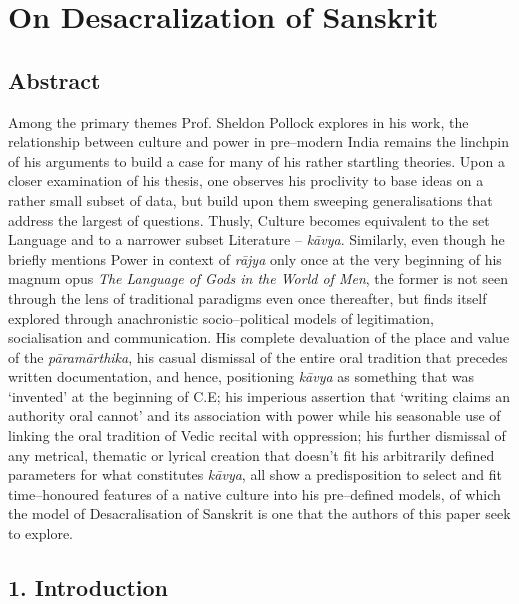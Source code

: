 
\chapter{On Desacralization of Sanskrit}



\section*{Abstract}

Among the primary themes Prof. Sheldon Pollock explores in his work, the relationship between culture and power in pre–modern India remains the linchpin of his arguments to build a case for many of his rather startling theories. Upon a closer examination of his thesis, one observes his proclivity to base ideas on a rather small subset of data, but build upon them sweeping generalisations that address the largest of questions. Thusly, Culture becomes equivalent to the set Language and to a narrower subset Literature – \textit{kāvya}. Similarly, even though he briefly mentions Power in context of \textit{rājya} only once at the very beginning of his magnum opus \textit{The Language of Gods in the World of Men}, the former is not seen through the lens of traditional paradigms even once thereafter, but finds itself explored through anachronistic socio–political models of legitimation, socialisation and communication. His complete devaluation of the place and value of the \textit{pāramārthika}, his casual dismissal of the entire oral tradition that precedes written documentation, and hence, positioning \textit{kāvya} as something that was ‘invented’ at the beginning of C.E; his imperious assertion that ‘writing claims an authority oral cannot’ and its association with power while his seasonable use of linking the oral tradition of Vedic recital with oppression; his further dismissal of any metrical, thematic or lyrical creation that doesn’t fit his arbitrarily defined parameters for what constitutes \textit{kāvya}, all show a predisposition to select and fit time–honoured features of a native culture into his pre–defined models, of which the model of Desacralisation of Sanskrit is one that the authors of this paper seek to explore.


\section*{1. Introduction}

